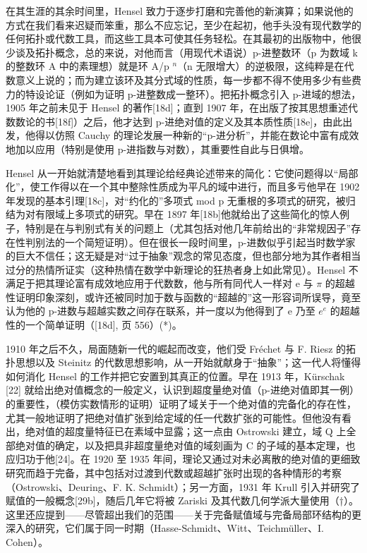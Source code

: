 在其生涯的其余时间里，Hensel 致力于逐步打磨和完善他的新演算；如果说他的方式在我们看来迟疑而笨重，那么不应忘记，至少在起初，他手头没有现代数学的任何拓扑或代数工具，而这些工具本可使其任务轻松。在其最初的出版物中，他很少谈及拓扑概念，总的来说，对他而言（用现代术语说）p-进整数环（p 为数域 k 的整数环 A 中的素理想）就是环 A/p \(^{n}\)（n 无限增大）的逆极限，这纯粹是在代数意义上说的；而为建立该环及其分式域的性质，每一步都不得不使用多少有些费力的特设论证（例如为证明 p-进整数成一整环）。把拓扑概念引入 p-进域的想法，1905 年之前未见于 Hensel 的著作{[}18d{]}；直到 1907 年，在出版了按其思想重述代数数论的书{[}18f{]}）之后，他才达到 p-进绝对值的定义及其本质性质{[}18e{]}，由此出发，他得以仿照 Cauchy 的理论发展一种新的“p-进分析”，并能在数论中富有成效地加以应用（特别是使用 p-进指数与对数），其重要性自此与日俱增。

Hensel 从一开始就清楚地看到其理论给经典论述带来的简化：它使问题得以“局部化”，使工作得以在一个其中整除性质成为平凡的域中进行，而且多亏他早在 1902 年发现的基本引理{[}18c{]}，对“约化的”多项式 mod p 无重根的多项式的研究，被归结为对有限域上多项式的研究。早在 1897 年{[}18b{]}他就给出了这些简化的惊人例子，特别是在与判别式有关的问题上（尤其包括对他几年前给出的“非常规因子”存在性判别法的一个简短证明）。但在很长一段时间里，p-进数似乎引起当时数学家的巨大不信任；这无疑是对“过于抽象”观念的常见态度，但也部分地为其作者相当过分的热情所证实（这种热情在数学中新理论的狂热者身上如此常见）。Hensel 不满足于把其理论富有成效地应用于代数数，他与所有同代人一样对 e 与 \(\pi\) 的超越性证明印象深刻，或许还被同时加于数与函数的“超越的”这一形容词所误导，竟至认为他的 p-进数与超越实数之间存在联系，并一度以为他得到了 e 乃至 \(e^{e}\) 的超越性的一个简单证明（{[}18d{]}, 页 556）(*)。

1910 年之后不久，局面随新一代的崛起而改变，他们受 Fréchet 与 F. Riesz 的拓扑思想以及 Steinitz 的代数思想影响，从一开始就献身于“抽象”；这一代人将懂得如何消化 Hensel 的工作并把它安置到其真正的位置。早在 1913 年，Kürschak {[}22{]} 就给出绝对值概念的一般定义，认识到超度量绝对值（p-进绝对值即其一例）的重要性，（模仿实数情形的证明）证明了域关于一个绝对值的完备化的存在性，尤其一般地证明了把绝对值扩张到给定域的任一代数扩张的可能性。但他没有看出，绝对值的超度量特征已在素域中显露；这一点由 Ostrowski 建立，域 Q 上全部绝对值的确定，以及把具非超度量绝对值的域刻画为 C 的子域的基本定理，也应归功于他{[}24{]}。在 1920 至 1935 年间，理论又通过对未必离散的绝对值的更细致研究而趋于完备，其中包括对过渡到代数或超越扩张时出现的各种情形的考察（Ostrowski、Deuring、F. K. Schmidt）；另一方面，1931 年 Krull 引入并研究了赋值的一般概念{[}29b{]}，随后几年它将被 Zariski 及其代数几何学派大量使用（†）。这里还应提到——尽管超出我们的范围——关于完备赋值域与完备局部环结构的更深入的研究，它们属于同一时期（Hasse-Schmidt、Witt、Teichmüller、I. Cohen）。

